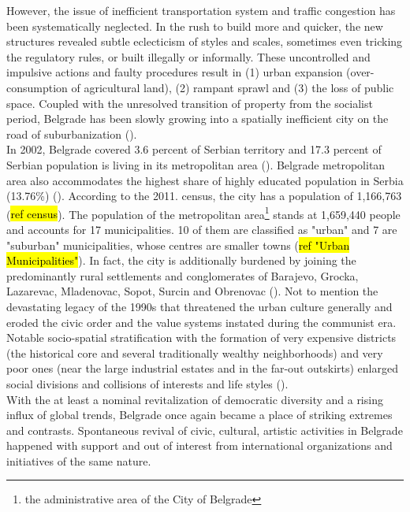 \documentclass[11pt]{report}
\begin{document}
However, the issue of inefficient transportation system and traffic congestion has been systematically neglected.
In the rush to build more and quicker, the new structures revealed subtle eclecticism of styles and scales, sometimes even tricking the regulatory rules, or built illegally or informally.
These uncontrolled and impulsive actions and faulty procedures result in (1) urban expansion (over-consumption of agricultural land), (2) rampant sprawl and (3) the loss of public space. Coupled with the unresolved transition of property from the socialist period, Belgrade has been slowly growing into a spatially inefficient city on the road of suburbanization (\cite{Zekovic et al. 2015}).
\\
In 2002, Belgrade covered 3.6 percent of Serbian territory and 17.3 percent of Serbian population is living in its metropolitan area (\cite{Cities in Transition 2013}).
Belgrade metropolitan area also accommodates the highest share of highly educated population in Serbia (13.76\%) (\cite{Vukmirovic et al 2013}).
According to the 2011. census, the city has a population of 1,166,763 (\hl{ref census}).
The population of the metropolitan area\footnote{the administrative area of the City of Belgrade}                 
stands at 1,659,440 people and accounts for 17 municipalities.
10 of them are classified as "urban" and 7 are "suburban" municipalities, whose centres are smaller towns (\hl{ref "Urban Municipalities"}).
In fact, the  city  is additionally burdened by joining the predominantly rural  settlements  and  conglomerates  of Barajevo, Grocka,  Lazarevac,  Mladenovac,  Sopot,  Surcin  and Obrenovac (\cite{Samardzic in Doytchinov 2015}).
Not to mention the devastating legacy of the 1990s that threatened the  urban  culture generally and eroded the civic order and the value systems instated during the communist era.
Notable socio-spatial stratification with the formation of very expensive districts (the historical core and several traditionally wealthy neighborhoods) and very poor ones (near the large industrial estates and in the far-out outskirts) enlarged social divisions and collisions of interests and life styles (\cite{Hirt 2009}).
\\
With the at least a nominal revitalization of democratic diversity and a rising influx of global trends, Belgrade once again became a place of striking extremes and contrasts. 
Spontaneous revival of civic, cultural, artistic activities in Belgrade happened with support and out of interest from international organizations and initiatives of the same nature.
\end{document}
